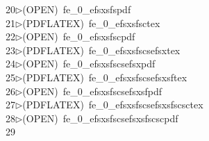 \begin{tabbing}
20\>$\triangleright$\>(OPEN)\ fe\_0\_efsxsfspdf\\[0pt]
21\>$\triangleright$\>(PDFLATEX)\ fe\_0\_efsxsfsctex\\[0pt]
22\>$\triangleright$\>(OPEN)\ fe\_0\_efsxsfscpdf\\[0pt]
23\>$\triangleright$\>(PDFLATEX)\ fe\_0\_efsxsfscsefsxtex\\[0pt]
24\>$\triangleright$\>(OPEN)\ fe\_0\_efsxsfscsefsxpdf\\[0pt]
25\>$\triangleright$\>(PDFLATEX)\ fe\_0\_efsxsfscsefsxsftex\\[0pt]
26\>$\triangleright$\>(OPEN)\ fe\_0\_efsxsfscsefsxsfpdf\\[0pt]
27\>$\triangleright$\>(PDFLATEX)\ fe\_0\_efsxsfscsefsxsfscsctex\\[0pt]
28\>$\triangleright$\>(OPEN)\ fe\_0\_efsxsfscsefsxsfscscpdf\\[0pt]
29\>\end{tabbing}
